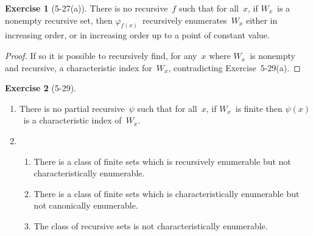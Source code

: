 \documentclass[letterpaper]{article}
\theoremstyle{definition}
\newtheorem*{exer}{Exercise}
\theoremstyle{remark}
\theoremstyle{direction}
\begin{document}
\begin{exer}[5-27(a)]
There is no recursive~$f$ such that for all~$x$, if $W_x$~is a nonempty recursive set, then $\varphi_{f(x)}$~recursively enumerates~$W_x$ either in increasing order, or in increasing order up to a point of constant value.
\end{exer}
\begin{proof}
If so it is possible to recursively find, for any~$x$ where $W_x$~is nonempty and recursive, a characteristic index for~$W_x$, contradicting Exercise~5-29(a).
\end{proof}

\begin{exer}[5-29]
\begin{enumerate}[itemsep=0pt]
\item[(a)] There is no partial recursive~$\psi$ such that for all~$x$, if $W_x$~is finite then $\psi(x)$~is a characteristic index of~$W_x$.
\item[(b)]
\begin{enumerate}[itemsep=0pt]
\item[(i)] There is a class of finite sets which is recursively enumerable but not characteristically enumerable.
\item[(ii)] There is a class of finite sets which is characteristically enumerable but not canonically enumerable.
\item[(iii)] The class of recursive sets is not characteristically enumerable.
\end{enumerate}
\end{enumerate}
\end{exer}
\end{document}
